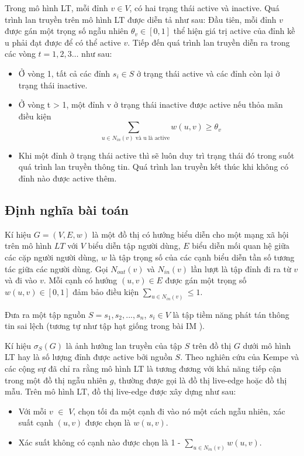 Trong mô hình LT, mỗi đỉnh $v \in V$, có hai trạng thái active và inactive. Quá trình lan truyền trên mô hình LT được diễn tả như sau: Đầu tiên, mỗi đỉnh $v$ được gán một trọng số ngẫu nhiên $\theta_{v} \in [0,1]$ thể hiện giá trị active của đỉnh kề u phải đạt được để có thể active $v$. Tiếp đến quá trình lan truyền diễn ra trong các vòng $t = 1,2,3…$ như sau: 		
\begin {itemize}
\item Ở vòng 1, tất cả các đỉnh $s_{i} \in S$ ở trạng thái active và các đỉnh còn lại ở trạng thái inactive.

\item Ở vòng t > 1, một đỉnh v ở trạng thái inactive được active nếu thỏa mãn điều kiện $$\sum_{\mbox{ $u \in N_{in}(v) $ và  u  là active}} w(u, v)\geq \theta_v$$

\item Khi một đỉnh ở trạng thái active thì sẽ luôn duy trì trạng thái đó trong suốt quá trình lan truyền thông tin. Quá trình lan truyền kết thúc khi không có đỉnh nào được active thêm.	
\end {itemize}

\subsection{Định nghĩa bài toán}
Kí hiệu $G = (V, E, w)$ là một đồ thị có hướng biểu diễn cho một mạng xã hội trên mô hình $LT$ với $V$ biểu diễn tập người dùng, $E$ biểu diễn mối quan hệ giữa các cặp người người dùng, $w$ là tập trọng số của các cạnh biểu diễn tần số tương tác giữa các người dùng. Gọi $N_{out}(v)$ và $N_{in}(v)$ lần lượt là tập đỉnh đi ra từ $v$ và đi vào $v$. Mỗi cạnh có hướng $(u,v) \in E$ được gán một trọng số $w(u,v) \in [0,1]$ đảm bảo điều kiện $\sum_{u \in N_{in}(v)} \leq 1$.

Đưa ra một tập nguồn $S = {s_{1}, s_{2}, ... , s_{n}}$, $s_{i} \in V$ là tập tiềm năng phát tán thông tin sai lệch (tương tự như tập hạt giống trong bài IM \cite{kemple2}).

Kí hiệu $\sigma_{S}(G)$ là ảnh hưởng lan truyền của tập $S$ trên đồ thị $G$ dưới mô hình LT hay là số lượng đỉnh được active bởi nguồn $S$. Theo nghiên cứu của Kempe và các cộng sự \cite{kemple1} đã chỉ ra rằng mô hình LT là tương đương với khả năng tiếp cận trong một đồ thị ngẫu nhiên $g$, thường được gọi là đồ thị live-edge hoặc đồ thị mẫu. Trên mô hình LT, đồ thị live-edge được xây dựng như sau:
\begin {itemize}
\item Với mỗi $v$ $\in$ $V$, chọn tối đa một cạnh đi vào nó một cách ngẫu nhiên, xác suất cạnh $(u, v)$ được chọn là $w(u, v)$.

\item Xác suất không có cạnh nào được chọn là 1 - $\sum_{u \in N_{in}(v)} w(u,v)$.
\end {itemize}

